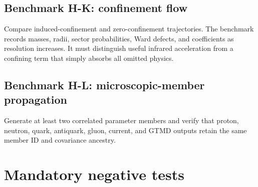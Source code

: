 \documentclass[11pt]{article}
\begin{document}
\subsection{Benchmark H-K: confinement flow}

Compare induced-confinement and zero-confinement trajectories.  The benchmark
records masses, radii, sector probabilities, Ward defects, and coefficients as
resolution increases.  It must distinguish useful infrared acceleration from
a confining term that simply absorbs all omitted physics.

\subsection{Benchmark H-L: microscopic-member propagation}

Generate at least two correlated parameter members and verify that proton,
neutron, quark, antiquark, gluon, current, and GTMD outputs retain the same
member ID and covariance ancestry.

\section{Mandatory negative tests}
\label{sec:negative-tests}
\end{document}
